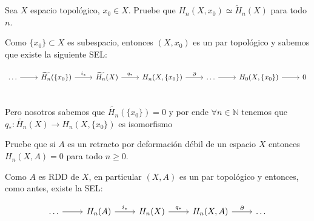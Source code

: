 \documentclass[11pt,a4paper,oneside]{article}
\newcommand{\N}{{\mathbb{N}}}
\newcommand{\sett}[1]{\{#1\}}
\def \ge{\geqslant}
\newenvironment{proof}[1][Demostraci\'on]{\begin{trivlist}
\item[\hskip \labelsep {\bfseries #1}]}{\end{trivlist}}
\newcommand{\qed}{\nobreak \ifvmode \relax \else
      \ifdim\lastskip<1.5em \hskip-\lastskip
      \hskip1.5em plus0em minus0.5em \fi \nobreak
      \vrule height0.75em width0.5em depth0.25em\fi}
\begin{document}
\begin{enumerate}
\begin{proof}
\end{proof}


%
%

\item Sea $X$ espacio topol\'ogico, $x_0\in X$. Pruebe que $H_n (X, x_0 ) \simeq \tilde H_n (X)$ para todo $n$. 

\begin{proof}

Como $\sett{x_0} \subset X$ es subespacio, entonces $(X,x_0)$ es un par topol\'ogico y sabemos que existe la siguiente SEL:

\[
\begin{tikzcd}
\dots \rar & \widetilde{H_n}(\sett{x_0}) \arrow{r}{i_*} & \widetilde{H_n}(X) \arrow{r}{q_*} & H_n(X,\sett{x_0}) \arrow{r}{\partial} & \dots \rar & H_0(X,\sett{x_0}) \rar & 0 \\
\end{tikzcd}
\]

Pero nosotros sabemos que $\widetilde{H_n}(\sett{x_0}) = 0$ y por ende $\forall n \in \N$ tenemos que $q_* : \widetilde{H_n}(X) \rightarrow H_n(X, \sett{x_0})$ es isomorfismo \qed

\end{proof}

\item Pruebe que si $A$ es un retracto por deformaci\'on d\'ebil de un espacio $X$ entonces $H_n(X,A)=0$ para todo $n\ge 0$.

\begin{proof}

Como $A$ es RDD de $X$, en particular $(X,A)$ es un par topol\'ogico y entonces, como antes, existe la SEL:

\[
\begin{tikzcd}
\dots \rar & {H_n}(A) \arrow{r}{i_*} & {H_n}(X) \arrow{r}{q_*} & H_n(X,A) \arrow{r}{\partial} & \dots  \\
\end{tikzcd}
\]


\end{proof}
\end{enumerate}
\end{document}
